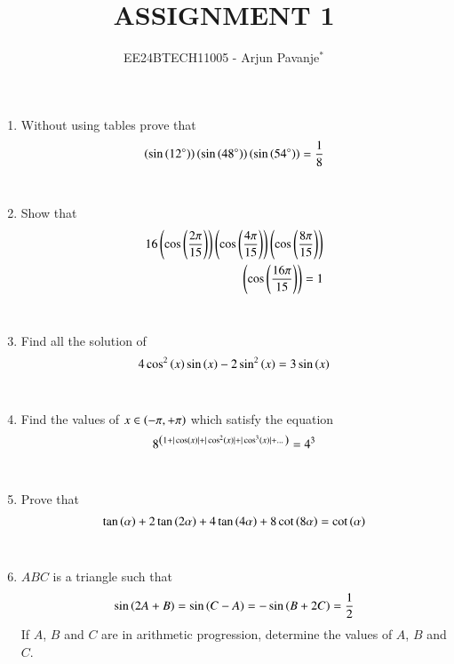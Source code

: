 \documentclass[journal,12pt,article,twocolumn]{IEEEtran}
\theoremstyle{remark}
\begin{document}

\vspace{3cm}

\title{ASSIGNMENT 1}
\author{EE24BTECH11005 - Arjun Pavanje$^{*}$%
}
\maketitle
\newpage
\bigskip
\begin{enumerate}
\item Without using tables prove that 
\begin{align*} 
\left(\sin\left(12^{\circ}\right)\right)\left(\sin\left(48^{\circ}\right)\right)\left(\sin\left(54^{\circ}\right)\right)= \frac{1}{8}
\end{align*}
\hfill {}\\
\item Show that 
\begin{align*}
16\left(\cos\left(\frac{2\pi}{15}\right)\right)\left(\cos\left(\frac{4\pi}{15}\right)\right)\left(\cos\left(\frac{8\pi}{15}\right)\right)\\\left(\cos\left(\frac{16\pi}{15}\right)\right)=1
\end{align*}
\hfill{}\\
\item Find all the solution of 
\begin{align*}
4\cos^2\left(x\right) \sin \left(x\right) -2\sin^2\left(x\right) = 3\sin \left(x\right)
\end{align*}
\hfill{}\\
\item Find the values of $x \in \left(-\pi, +\pi\right)$ which satisfy the equation
\begin{align*}
8^{\left(1+|\cos \left(x\right)|+|\cos^2\left(x\right)|+|\cos^3\left(x\right)|+\dots\right)}= 4^3
\end{align*}
\hfill{}\\
\item Prove that 
\begin{align*}
\tan \left(\alpha\right)+2\tan \left(2\alpha\right)+4\tan \left(4\alpha\right)+8\cot \left(8\alpha\right)=\cot \left(\alpha\right)
\end{align*}
\hfill{}\\
\item $ABC$ is a triangle such that 
\begin{align*}
\sin{\ensuremath{\left(2A+B\right)}}=\sin{\ensuremath{\left(C-A\right)}}=-\sin{\ensuremath{\left(B+2C\right)}}=\frac{1}{2}
\end{align*}
If $A$, $B$ and $C$ are in arithmetic progression, determine the values of $A$, $B$ and $C$.
\hfill{}\\

\end{enumerate}
\end{document}
